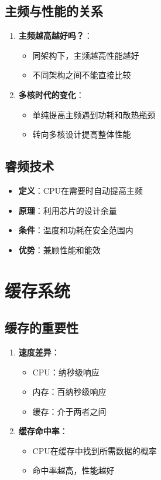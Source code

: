 \documentclass[12pt,UTF8]{ctexbook}
\begin{document}
\section{主频与性能的关系}

\begin{enumerate}
    \item \textbf{主频越高越好吗？}：
    \begin{itemize}[leftmargin=2em]
        \item 同架构下，主频越高性能越好
        \item 不同架构之间不能直接比较
    \end{itemize}
    
    \item \textbf{多核时代的变化}：
    \begin{itemize}[leftmargin=2em]
        \item 单纯提高主频遇到功耗和散热瓶颈
        \item 转向多核设计提高整体性能
    \end{itemize}
\end{enumerate}

\section{睿频技术}

\begin{itemize}[leftmargin=2em]
    \item \textbf{定义}：CPU在需要时自动提高主频
    \item \textbf{原理}：利用芯片的设计余量
    \item \textbf{条件}：温度和功耗在安全范围内
    \item \textbf{优势}：兼顾性能和能效
\end{itemize}

\chapter{缓存系统}

\section{缓存的重要性}

\begin{enumerate}
    \item \textbf{速度差异}：
    \begin{itemize}[leftmargin=2em]
        \item CPU：纳秒级响应
        \item 内存：百纳秒级响应
        \item 缓存：介于两者之间
    \end{itemize}
    
    \item \textbf{缓存命中率}：
    \begin{itemize}[leftmargin=2em]
        \item CPU在缓存中找到所需数据的概率
        \item 命中率越高，性能越好
    \end{itemize}
\end{enumerate}
\end{document}
